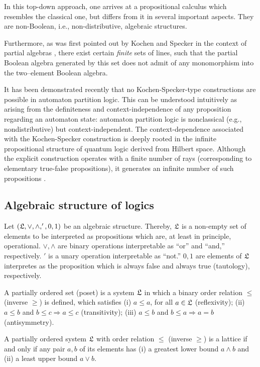In this top-down approach, one arrives at a propositional calculus which
resembles the classical one, but differs from it in several important
aspects. They are non-Boolean, i.e.,  non-distributive, algebraic
structures.

Furthermore, as was first pointed out by Kochen and Specker in the
context of partial algebras \cite{kochen1,ZirlSchl-65,redhead,mermin-93},
there exist certain
{\em finite\/} sets of lines, such that the
partial Boolean algebra generated by this set does not admit of any
monomorphism into the two--element Boolean algebra.

It has been demonstrated recently \cite{svozil-tkadlec} that no
Kochen-Specker-type constructions are possible in automaton partition
logic. This can be understood intuitively as arising from the
definiteness and
context-independence of any proposition regarding an automaton state:
automaton partition logic is nonclassical (e.g., nondistributive) but
context-independent. The context-dependence associated with the
Kochen-Specker construction is deeply rooted in the infinite
propositional structure of quantum logic derived from Hilbert space.
Although the explicit construction operates with a finite number of rays
(corresponding to elementary true-false propositions), it generates an
infinite number of such propositions \cite{havlicek}.

\subsection{Algebraic structure of logics}

Let $({\frak L}, \vee  ,\wedge  , ' ,0,1)$ be an algebraic structure.
Thereby, ${\frak L}$ is a non-empty set of elements to be interpreted
as propositions which are, at
least in principle, operational. $\vee  ,\wedge  $ are binary operations
interpretable as ``or'' and ``and,''  respectively.
$'$ is a unary operation interpretable as ``not.''
$0,1$ are elements of  ${\frak L}$ interpretes as the proposition
which is always false and always true (tautology), respectively.

 A  partially ordered set (poset)
 is a system ${\frak L}$ in which a binary order relation
 $\le$ (inverse $\ge$)
 is defined, which satisfies
(i)
$a\le a$, for all $a\in {\frak L}$ (reflexivity);
(ii)
$a\le  b$ and $ b\le c\Longrightarrow a\le c$ (transitivity);
(iii)
$a\le b$ and $b\le a\Longrightarrow a=b$ (antisymmetry).

A  partially ordered system ${\frak L}$ with order relation
 $\le $ (inverse $\ge$)
 is a  lattice if and only if any pair $a,b$  of its elements
 has
 (i)
 a greatest lower bound  $a\wedge  b$
 and
(ii)
a least upper bound
 $a\vee b$.


